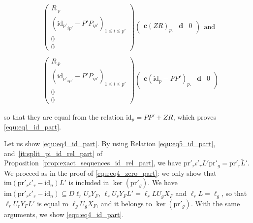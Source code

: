 \documentclass{ifacconf}
\newcommand\g[1]{\textbf{#1}}
\newcommand\id[1]{\text{id}_{#1}}
\newcommand\im{\text{im}}
\newcommand\p{\text{pr}}
\begin{document}
\begin{small}
  \[\begin{split}
  &\begin{pmatrix}
  R_{.p}\\
  \left({\id{p'}}_{ip'}-P'P_{ip'}\right)_{1\leq i\leq p'}\\
  0\\
  0
  \end{pmatrix}\begin{pmatrix}
    \g{c}\left(ZR\right)_{p.} & \g{d} & 0
  \end{pmatrix}\ \ \text{and}\\
  & \\
  &\begin{pmatrix}
    R_{.p}\\
    \left({\id{p'}}_{ip'}-P'P_{ip'}\right)_{1\leq i\leq p'}\\
    0\\
    0
  \end{pmatrix}\begin{pmatrix}
    \g{c}\left(\id{p}-PP'\right)_{p.} & \g{d} & 0
  \end{pmatrix}
  \end{split}\]
\end{small}
so that they are equal from the relation $\id{p}=PP'+ZR$, which proves
\eqref{equ:eq1_id_part}.

Let us show \eqref{equ:eq4_id_part}. By using Relation
\eqref{equ:eq5_id_part}, and~\ref{it:split_pi_id_rel_part} of
Proposition~\ref{prop:exact_sequences_id_rel_part}, we have $\p'_r
\iota'_rL'\p'_g=\p'_r\tilde{L}'$. We proceed as in the proof of
\eqref{equ:eq4_zero_part}: we only show that $\im(\p'_r\iota'_r
  -\id{n})L'$ is included in $\ker\left(\p'_g\right)$. We have $\im(
  \p'_r\iota'_r-\id{n})\subseteq D\ell_rU_rY_F$, $\ell_rU_rY_FL'=\ell_r
  LU_gX_F$ and $\ell_rL=\ell_g$, so that $\ell_rU_rY_FL'$ is equal ro
  $\ell_gU_gX_F$, and it belongs to $\ker(\p'_g)$. With the same
  arguments, we show \eqref{equ:eq4_id_part}.


\end{document}

